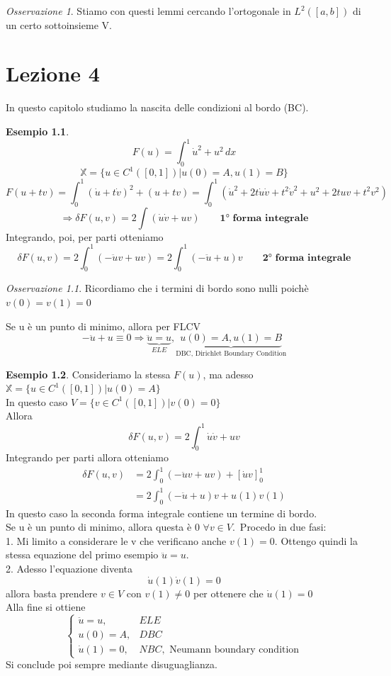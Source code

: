 \documentclass[a4paper]{book}
\theoremstyle{definition}
\newtheorem{ex}{Esempio}
\theoremstyle{remark}
\newtheorem{oss}{Osservazione}
\theoremstyle{definition}
\newcommand{\bbx}{\mathbb{X}}
\newcommand{\ra}{\Rightarrow}
\begin{document}
\begin{oss}
Stiamo con questi lemmi cercando l'ortogonale in $L^2([a,b]) $ di un certo sottoinsieme V.
\end{oss}

\chapter{Lezione 4}
In questo capitolo studiamo la nascita delle condizioni al bordo (BC).\\

\begin{ex}
\[
	F(u)= \int_0^1 \dot{u}^2 + u^2\, dx
\]
\[
	\bbx = \{u \in C^1([0,1]) | u(0) = A, u(1) = B \}	
\]
\[
	F(u + tv) = \int_0^1 (\dot{u} + t \dot{v})^2 + (u + tv) = \int_0^1 (\dot{u}^2 + 2t \dot{u} \dot{v} +t^2 \dot{v}^2 + u^2 +2tuv + t^2v^2)
\]
\[
	\ra \delta F(u, v) = 2 \int (\dot{u} \dot{v} +uv) \qquad{\textbf{1° forma integrale}}
\]
Integrando, poi, per parti otteniamo 
\[
	\delta F(u, v) = 2 \int_{0}^{1}(-\ddot{u}v+uv) = 2 \int_{0}^{1}(-\ddot{u}+u)v \qquad{\textbf{2° forma integrale}}
\]
\begin{oss}
Ricordiamo che i termini di bordo sono nulli poichè $v(0)=v(1)=0$
\end{oss}
\noindent 
Se u è un punto di minimo, allora per FLCV
\[
	-\ddot{u} + u \equiv 0 \ra \underbrace{\ddot{u} = u}_{ELE}, \underbrace{u(0) = A, u(1) = B}_{\text{DBC, Dirichlet Boundary Condition}}	
\]
\end{ex}

\begin{ex}
Consideriamo la stessa $F(u)$, ma adesso $\bbx = \{u \in C^1([0,1])|u(0) = A \} $\\
In questo caso $V = \{v \in C^1([0,1])|v(0) = 0 \} $\\
Allora 
\[
	\delta F(u,v) = 2 \int_{0}^{1} \dot{u} \dot{v} + uv
\]
Integrando per parti allora otteniamo 
\begin{align}
	\delta F(u,v) &=  2 \int_{0}^{1} (-\ddot{u}v + uv) + [\dot{u}	v]_0^1 \\
	& = 2 \int_{0}^{1}(-\ddot{u} +u)v + u(1)v(1)
\end{align}
In questo caso la seconda forma integrale contiene un termine di bordo.\\
Se u è un punto di minimo, allora questa è 0 $\forall v \in V$.\
Procedo in due fasi:\\
1. Mi limito a considerare le v che verificano anche $v(1) = 0$. Ottengo quindi la stessa equazione del primo esempio $\ddot{u}	= u $.\\
2. Adesso l'equazione diventa 
\[
	\dot{u}(1) \dot{v}(1) = 0
\]
allora basta prendere $v \in V$ con $v(1) \not = 0 $ per ottenere che $\dot{u}(1) = 0$\\
Alla fine si ottiene
\[
\begin{cases}
	\ddot{u} = u, & ELE \\
	u(0) = A, & DBC \\
	\dot{u}(1) = 0, & NBC, \text{ Neumann boundary condition}
\end{cases}
\]
Si conclude poi sempre mediante disuguaglianza.
\end{ex}
\end{document}
